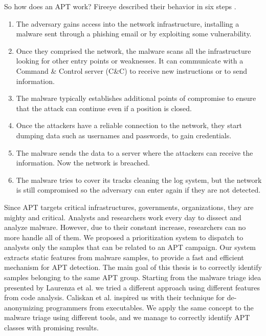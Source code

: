 So how does an APT work? Fireeye described their behavior in six steps \cite{fireeye_anatomy}.

\begin{enumerate}
	\item The adversary gains access into the network infrastructure, installing a malware sent through a phishing email or by exploiting some vulnerability.
	\item Once they comprised the network, the malware scans all the infrastructure looking for other entry points or weaknesses. It can communicate with a Command \& Control server (C\&C) to receive new instructions or to send information.
	\item The malware typically establishes additional points of compromise to ensure that the attack can continue even if a position is closed.
	\item Once the attackers have a reliable connection to the network, they start dumping data such as usernames and passwords, to gain credentials.
	
	\item The malware sends the data to a server where the attackers can receive the information. Now the network is breached.
	
	\item The malware tries to cover its tracks cleaning the log system, but the network is still compromised so the adversary can enter again if they are not detected.
\end{enumerate}

Since APT targets critical infrastructures, governments, organizations, they are mighty and critical. Analysts and researchers work every day to dissect and analyze malware. However, due to their constant increase, researchers can no more handle all of them. 
We proposed a prioritization system to dispatch to analysts only the samples that can be related to an APT campaign. Our system extracts static features from malware samples, to provide a fast and efficient mechanism for APT detection. The main goal of this thesis is to correctly identify samples belonging to the same APT group. Starting from the malware triage \cite{laurenza2017malware} idea presented by Laurenza et al. we tried a different approach using different features from code analysis. Caliskan et al. \cite{caliskan2015anonymizing} inspired us with their technique for de-anonymizing programmers from executables. We apply the same concept to the malware triage using different tools, and we manage to correctly identify APT classes with promising results. 


